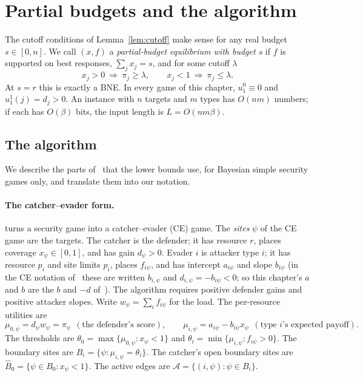 \section{Partial budgets and the algorithm}\label{artlck:sec:defs}

The cutoff conditions of Lemma~\ref{lem:cutoff} make sense for any real budget $s\in[0,n]$. We call
$(x,f)$ a \emph{partial-budget equilibrium with budget $s$} if $f$ is supported on best responses,
$\sum_jx_j=s$, and for some cutoff $\lambda$
\begin{equation}\label{artlck:eq:cutoff}
 x_j>0\ \Rightarrow\ \pi_j\ge\lambda,\qquad x_j<1\ \Rightarrow\ \pi_j\le\lambda .
\end{equation}
At $s=r$ this is exactly a BNE. In every game of this chapter, $u_1^0\equiv0$ and $u_1^1(j)=d_j>0$. An
instance with $n$ targets and $m$ types has $O(nm)$ numbers; if each has $O(\beta)$ bits, the input
length is $L=O(nm\beta)$.

\subsection{The algorithm}\label{artlck:sec:alg}

We describe the parts of~\cite[Section~6.2]{lck16} that the lower bounds use, for Bayesian simple
security games only, and translate them into our notation.

\paragraph{The catcher--evader form.} \cite[Section~3.1]{lck16} turns a security game into a
catcher--evader (CE) game. The \emph{sites} $\psi$ of the CE game are the targets. The catcher is the
defender; it has resource $r$, places coverage $x_\psi\in[0,1]$, and has gain $d_\psi>0$. Evader $i$ is
attacker type $i$; it has resource $p_i$ and site limits $p_i$, places $f_{i\psi}$, and has intercept
$a_{i\psi}$ and slope $b_{i\psi}$ (in the CE notation of~\cite{lck16} these are written $b_{i,\psi}$ and
$d_{i,\psi}=-b_{i\psi}<0$; so this chapter's $a$ and $b$ are the $b$ and $-d$ of~\cite{lck16}). The algorithm requires positive defender gains and positive attacker slopes.
Write $w_\psi=\sum_if_{i\psi}$ for the load. The per-resource utilities are
\[
 \mu_{0,\psi}=d_\psi w_\psi=\pi_\psi\ \ (\text{the defender's score}),\qquad
 \mu_{i,\psi}=a_{i\psi}-b_{i\psi}x_\psi\ \ (\text{type $i$'s expected payoff}).
\]
The thresholds are $\theta_0=\max\{\mu_{0,\psi}:x_\psi<1\}$ and $\theta_i=\min\{\mu_{i,\psi}:f_{i\psi}>0\}$.
The boundary sites are $B_i=\{\psi:\mu_{i,\psi}=\theta_i\}$. The catcher's open boundary sites are
$\hat B_0=\{\psi\in B_0:x_\psi<1\}$. The active edges are $\mathcal A=\{(i,\psi):\psi\in B_i\}$.

